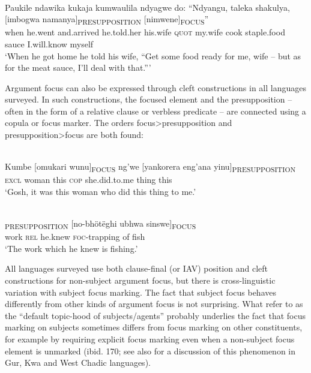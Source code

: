 \documentclass[output=paper]{langsci/langscibook}
\begin{document}
\ea\label{ex:17.nicolle}
\\
\gll Paukile ndawika kukaja kumwaulila ndyagwe do: “Ndyangu, taleka shakulya, [imbogwa namanya]\textsubscript{PRESUPPOSITION} [nimwene]\textsubscript{FOCUS}”\\
when he.went and.arrived he.told.her his.wife \textsc{quot} my.wife cook staple.food {\db}sauce I.will.know {\db}myself \\
\glt ‘When he got home he told his wife, “Get some food ready for me, wife -- but as for the meat sauce, I’ll deal with that.”’
\z

Argument focus can also be expressed through cleft constructions in all languages surveyed. In such constructions, the focused element and the presupposition -- often in the form of a relative clause or verbless predicate -- are connected using a copula or focus marker. The orders focus>presupposition and presupposition>focus are both found:

\ea\label{ex:18.nicolle}
\\
\gll Kumbe [omukari wunu]\textsubscript{FOCUS} ng’we [yankorera eng’ana yinu]\textsubscript{PRESUPPOSITION}\\
\textsc{excl} {\db}woman this \textsc{cop} {\db}she.did.to.me thing this \\
\glt ‘Gosh, it was this woman who did this thing to me.’
\z

\ea\label{ex:19.nicolle}
\\
\textsubscript{PRESUPPOSITION} [no-bhötëghi ubhwa sinswe]\textsubscript{FOCUS}\\
{\db}work \textsc{rel} he.knew {\db}\textsc{foc}-trapping of fish \\
\glt ‘The work which he knew is fishing.’
\z

All languages surveyed use both clause-final (or IAV) position and cleft constructions for non-subject argument focus, but there is cross-linguistic variation with subject focus marking. The fact that subject focus behaves differently from other kinds of argument focus is not surprising. What \citet[159]{gueldemannetal2015} refer to as the “default topic-hood of subjects/agents” probably underlies the fact that focus marking on subjects sometimes differs from focus marking on other constituents, for example by requiring explicit focus marking even when a non-subject focus element is unmarked (ibid. 170; see also \citealt{fiedleretal2010} for a discussion of this phenomenon in Gur, Kwa and West Chadic languages).
\end{document}
